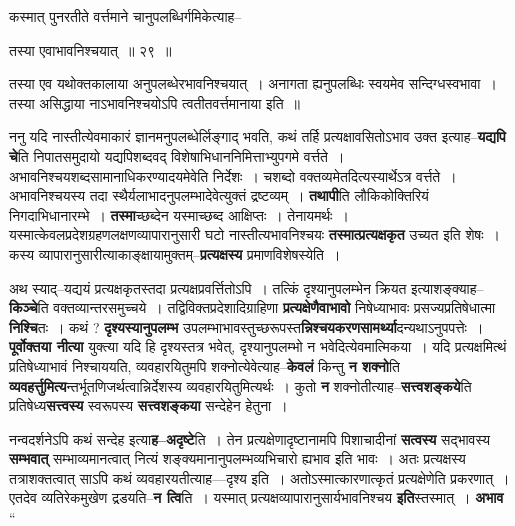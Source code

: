 \documentclass[article,12pt,a4paper]{memoir}
\begin{document}
	  \pstart कस्मात् पुनरतीते वर्त्तमाने चानुपलब्धिर्गमिकेत्याह--
	\pend
       
	  \bigskip
	  \begingroup
	

	  \pstart तस्या एवाभावनिश्चयात् ॥ २९ ॥
	\pend
      
	  \endgroup
	 

	  \pstart तस्या एव यथोक्तकालाया अनुपलब्धेरभावनिश्चयात् । अनागता ह्यनुपलब्धिः स्वयमेव सन्दिग्धस्वभावा । तस्या असिद्धाया नाऽभावनिश्चयोऽपि त्वतीतवर्त्तमानाया इति ॥
	\pend
      
	  \endgroup
	

	  \pstart ननु यदि नास्तीत्येवमाकारं ज्ञानमनुपलब्धेर्लिङ्गाद् भवति, कथं तर्हि प्रत्यक्षावसितोऽभाव उक्त इत्याह--\textbf{यद्यपि चे}ति निपातसमुदायो यद्यपिशब्दवद् विशेषाभिधाननिमित्ताभ्युपगमे वर्त्तते । अभावनिश्चयशब्दसामानाधिकरण्यादयमेवेति निर्देशः । चशब्दो वक्तव्यमेतदित्यस्यार्थेऽत्र वर्त्तते । अभावनिश्चयस्य तदा स्थैर्यलाभादनुपलम्भादेवेत्युक्तं द्रष्टव्यम् । \textbf{तथापी}ति लौकिकोक्तिरियं निगदाभिधानारम्भे । \textbf{तस्मा}च्छब्देन यस्माच्छब्द आक्षिप्तः । तेनायमर्थः । यस्मात्केवलप्रदेशग्रहणलक्षणव्यापारानुसारी घटो नास्तीत्यभावनिश्चयः \textbf{तस्मात्प्रत्यक्षकृत} उच्यत इति शेषः । कस्य व्यापारानुसारीत्याकाङ्क्षायामुक्तम्--\textbf{प्रत्यक्षस्य} प्रमाणविशेषस्येति ।
	\pend
      

	  \pstart अथ स्याद्--यद्ययं प्रत्यक्षकृतस्तदा प्रत्यक्षप्रवर्त्तितोऽपि । तत्किं दृश्यानुपलम्भेन क्रियत इत्याशङ्क्याह--\textbf{किञ्चे}ति वक्तव्यान्तरसमुच्चये । तद्विविक्तप्रदेशादिग्राहिणा \textbf{प्रत्यक्षेणैवाभावो} निषेध्याभावः प्रसज्यप्रतिषेधात्मा \textbf{निश्चि}तः । कथं ? \textbf{दृश्यस्यानुपलम्भ} उपलम्भाभावस्तुच्छरूपस्त\textbf{न्निश्चयकरणसामर्थ्या}दन्यथाऽनुपपत्तेः । \textbf{पूर्वोक्तया नीत्या} युक्त्या यदि हि दृश्यस्तत्र भवेत्, दृश्यानुपलम्भो न भवेदित्येवमात्मिकया । यदि प्रत्यक्षमित्थं प्रतिषेध्याभावं निश्चाययति, व्यवहारयितुमपि शक्नोत्येवेत्याह--\textbf{केवलं} किन्तु \textbf{न शक्नो}ति \textbf{व्यवहर्त्तुमित्य}न्तर्भूतणिजर्थत्वान्निर्देशस्य व्यवहारयितुमित्यर्थः । कुतो \textbf{न} शक्नोतीत्याह--\textbf{सत्त्वशङ्कये}ति प्रतिषेध्य\textbf{सत्त्वस्य} स्वरूपस्य \textbf{सत्त्वशङ्कया} सन्देहेन हेतुना ।
	\pend
      

	  \pstart नन्वदर्शनेऽपि कथं सन्देह इत्या\textbf{ह--अदृष्टे}ति । तेन प्रत्यक्षेणादृष्टानामपि पिशाचादीनां \textbf{सत्वस्य} सद्भावस्य \textbf{सम्भवात्} सम्भाव्यमानत्वात् नित्यं शङ्क्यमानानुपलम्भव्यभिचारो ह्यभाव इति भावः । अतः प्रत्यक्षस्य तत्राशक्तत्वात् साऽपि कथं व्यवहारयतीत्याह—दृश्य इति । अतोऽस्मात्कारणात्कृतं प्रत्यक्षेणेति प्रकरणात् । एतदेव व्यतिरेकमुखेण द्रडयति--\textbf{न त्वि}ति । यस्मात् प्रत्यक्षव्यापारानुसार्यभावनिश्चय \textbf{इति}स्तस्मात् । \textbf{अभाव}  \leavevmode{} “
	  
\end{document}
